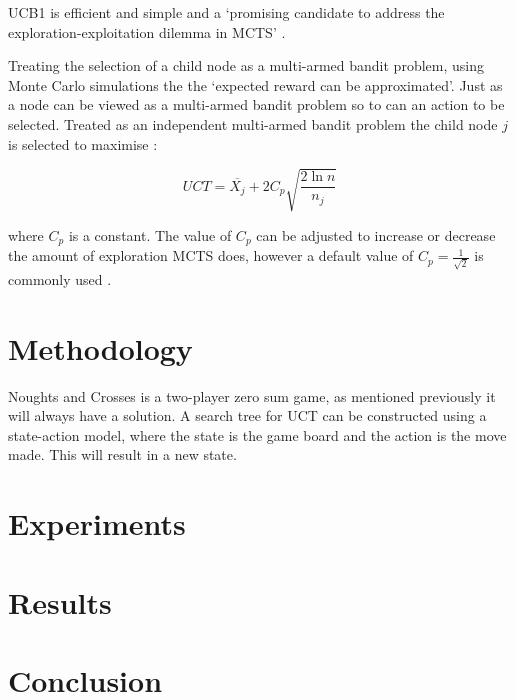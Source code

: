 \documentclass[conference]{IEEEtran}
\begin{document}
UCB1 is efficient and simple \cite{b2} and a `promising candidate to address the exploration-exploitation dilemma in MCTS' \cite{b2}.

Treating the selection of a child node as a multi-armed bandit problem, using Monte Carlo simulations the the `expected reward can be approximated'. Just as a node can be viewed as a multi-armed bandit problem so to can an action to be selected. Treated as an independent multi-armed bandit problem the child node $j$ is selected to maximise \cite{b2}:

\[UCT = \overline{X_{j}} +2C_{p}\sqrt{\frac{2 \ln n}{n_{j}}}\]

where $C_{p}$ is a constant. The value of $C_{p}$ can be adjusted to increase or decrease the amount of exploration MCTS does, however a default value of $C_{p} = \frac{1}{\sqrt{2}}$ is commonly used \cite{b2}.




\section{Methodology}
Noughts and Crosses is a two-player zero sum game, as mentioned previously it will always have a solution. A search tree for UCT can be constructed using a state-action model, where the state is the game board and the action is the move made. This will result in a new state. 

\section{Experiments}
\section{Results}
\section{Conclusion}
\end{document}

